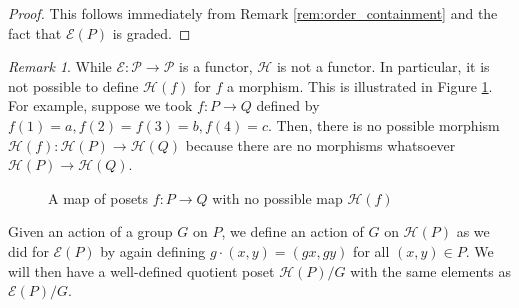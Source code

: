 \documentclass[smallextended, envcountsame, numbook]{svjour3}
\theoremstyle{plain}
\theoremstyle{definition}
\theoremstyle{remark}
\newtheorem{rmk}[thm]{Remark}
\numberwithin{equation}{section}
\begin{document}
\begin{proof}
This follows immediately from Remark \ref{rem:order_containment} and the fact that $\mathcal E(P)$ is graded.
\end{proof}

\begin{rmk}
While $\mathcal E\colon\mathcal P \rightarrow \mathcal P$ is a functor, $\mathcal H$ is not a functor. In particular, it is not possible to define $\mathcal H(f)$ for $f$ a morphism. This is illustrated in Figure \ref{fig:h_morphism}. For example, suppose we took $f\colon P \rightarrow Q$ defined by $f(1) = a, f(2) = f(3) = b,f(4) = c$. 
Then, there is no possible morphism $\mathcal H(f)\colon\mathcal H(P)\rightarrow \mathcal H(Q)$ because there are no morphisms whatsoever $\mathcal H(P) \rightarrow \mathcal H(Q)$.

\begin{figure}[h!]
\begin{center}
\quad
{}\quad
{} \quad
{}
\end{center}
\caption{\label{fig:h_morphism} A map of posets $f:P \rightarrow Q$ with no possible map $\mathcal H(f)$}
\end{figure}
\end{rmk}



Given an action of a group $G$ on $P$, we define an action of $G$ on $\mathcal{H}(P)$ as we did for $\mathcal{E}(P)$ by again defining $g\cdot (x,y) = (gx,gy)$ for all $(x,y)\in P$.  We will then have a well-defined quotient poset $\mathcal{H}(P)/G$ with the same elements as $\mathcal{E}(P)/G$.
\end{document}
